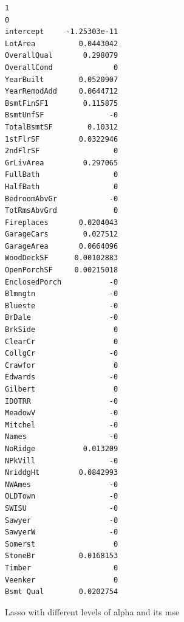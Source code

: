 \documentclass[11pt]{article}
\makeatletter
\newcommand{\boxspacing}{\kern\kvtcb@left@rule\kern\kvtcb@boxsep}
\newcommand{\prompt}[4]{
        {\ttfamily\llap{{\color{#2}[#3]:\hspace{3pt}#4}}\vspace{-\baselineskip}}
    }
\makeatother
\begin{document}
            \begin{tcolorbox}[breakable, size=fbox, boxrule=.5pt, pad at break*=1mm, opacityfill=0]
\prompt{Out}{outcolor}{23}{\boxspacing}
\begin{Verbatim}[commandchars=\\\{\}]
                         1
0
intercept     -1.25303e-11
LotArea          0.0443042
OverallQual       0.298079
OverallCond              0
YearBuilt        0.0520907
YearRemodAdd     0.0644712
BsmtFinSF1        0.115875
BsmtUnfSF               -0
TotalBsmtSF        0.10312
1stFlrSF         0.0322946
2ndFlrSF                 0
GrLivArea         0.297065
FullBath                 0
HalfBath                 0
BedroomAbvGr            -0
TotRmsAbvGrd             0
Fireplaces       0.0204043
GarageCars        0.027512
GarageArea       0.0664096
WoodDeckSF      0.00102883
OpenPorchSF     0.00215018
EnclosedPorch           -0
Blmngtn                 -0
Blueste                 -0
BrDale                  -0
BrkSide                  0
ClearCr                  0
CollgCr                 -0
Crawfor                  0
Edwards                 -0
Gilbert                  0
IDOTRR                  -0
MeadowV                 -0
Mitchel                 -0
Names                   -0
NoRidge           0.013209
NPkVill                 -0
NriddgHt         0.0842993
NWAmes                  -0
OLDTown                 -0
SWISU                   -0
Sawyer                  -0
SawyerW                 -0
Somerst                  0
StoneBr          0.0168153
Timber                   0
Veenker                  0
Bsmt Qual        0.0202754
\end{Verbatim}
\end{tcolorbox}
        
    Lasso with different levels of alpha and its mse
\end{document}
